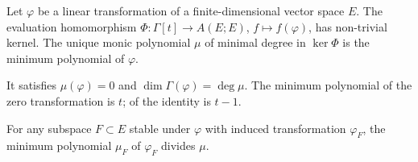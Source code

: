 Let $\varphi$ be a linear transformation of a finite-dimensional vector space $E$. The evaluation homomorphism $\Phi: \Gamma[t] \to A(E; E)$, $f \mapsto f(\varphi)$, has non-trivial kernel. The unique monic polynomial $\mu$ of minimal degree in $\ker \Phi$ is the minimum polynomial of $\varphi$.

It satisfies $\mu(\varphi) = 0$ and $\dim \Gamma(\varphi) = \deg \mu$. The minimum polynomial of the zero transformation is $t$; of the identity is $t-1$.

For any subspace $F \subset E$ stable under $\varphi$ with induced transformation $\varphi_F$, the minimum polynomial $\mu_F$ of $\varphi_F$ divides $\mu$.
